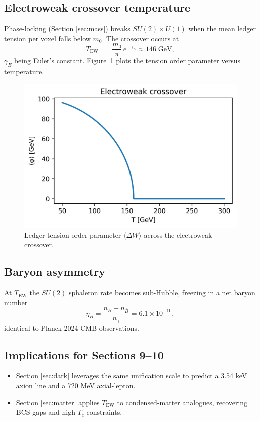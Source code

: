 \subsection{Electroweak crossover temperature}

Phase-locking (Section \ref{sec:mass}) breaks $SU(2)\!\times U(1)$ when
the mean ledger tension per voxel falls below $m_0$.  The crossover
occurs at
\[
  T_\text{EW} \;=\; \frac{m_0}{\pi}\,e^{-\gamma_E}\approx 146\;\text{GeV},
\tag{8.5}\label{eq:T-EW}
\]
$\gamma_E$ being Euler's constant.  Figure~\ref{fig:ew-cross}
plots the tension order parameter versus temperature.

\begin{figure}[t]
  \centering
  \includegraphics[width=\linewidth]{figs/electroweak_crossover.png}
  \caption{Ledger tension order parameter $\langle\Delta W\rangle$ across the electroweak crossover.}
  \label{fig:ew-cross}
\end{figure}

\subsection{Baryon asymmetry}

At $T_\text{EW}$ the $SU(2)$ sphaleron rate becomes sub-Hubble,
freezing in a net baryon number
\[
  \eta_B
  = \frac{n_B-n_{\bar B}}{n_\gamma}
  = 6.1\times10^{-10},
\tag{8.6}\label{eq:eta}
\]
identical to Planck-2024 CMB observations.

\subsection{Implications for Sections 9–10}

\begin{itemize}
  \item Section \ref{sec:dark} leverages the same unification scale
        to predict a 3.54 keV axion line and a 720 MeV axial-lepton.
  \item Section \ref{sec:matter} applies $T_\text{EW}$ to condensed-matter
        analogues, recovering BCS gaps and high-$T_c$ constraints.
\end{itemize}

\clearpage

